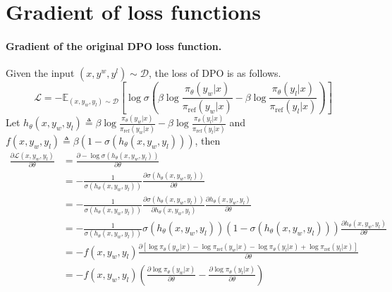 \section{Gradient of loss functions}
\label{sec: app_proof}
\paragraph{Gradient of the original DPO loss function.}
Given the input $(x, y^w, y^l)\sim\mathcal{D}$, the loss of DPO is as follows.
\begin{equation}
    \mathcal{L}=-\mathbb{E}_{(x,y_w,y_l)\sim\mathcal{D}}[\log \sigma (\beta \log\frac{\pi_\theta(y_w|x)}{\pi_{\text{ref}}(y_w|x)} - \beta \log\frac{\pi_\theta(y_l|x)}{\pi_{\text{ref}}(y_l|x)})]
\end{equation}
Let $h_\theta(x,y_w,y_l)\triangleq \beta \log\frac{\pi_\theta(y_w|x)}{\pi_\text{ref}(y_w|x)} - \beta\log\frac{\pi_\theta(y_l|x)}{\pi_\text{ref}(y_l|x)}$ and $f(x,y_w,y_l)\triangleq\beta(1- \sigma(h_\theta(x,y_w,y_l)))$, then
\begin{equation}
\begin{aligned}
    \frac{\partial \mathcal{L}(x,y_w,y_l)}{\partial \theta}
    & = \frac{\partial -\log \sigma(h_\theta(x,y_w,y_l))}{\partial \theta} \\
    & = -\frac{1}{\sigma(h_\theta(x,y_w,y_l))}\frac{\partial \sigma(h_\theta(x,y_w,y_l))}{\partial \theta} \\
    & = -\frac{1}{\sigma(h_\theta(x,y_w,y_l))}\frac{\partial \sigma(h_\theta(x,y_w,y_l))}{\partial h_\theta(x,y_w,y_l)}\frac{\partial h_\theta(x,y_w,y_l)}{\partial \theta} \\
    & = -\frac{1}{\sigma(h_\theta(x,y_w,y_l))}\sigma(h_\theta(x,y_w,y_l))(1-\sigma(h_\theta(x,y_w,y_l)))\frac{\partial h_\theta(x,y_w,y_l)}{\partial \theta} \\
    & = -f(x,y_w,y_l)\frac{\partial [\log\pi_\theta(y_w|x)- \log\pi_\text{ref}(y_w|x) - \log\pi_\theta(y_l|x)+ \log\pi_\text{ref}(y_l|x)]}{\partial \theta}\\
    & = -f(x,y_w,y_l)(\frac{\partial \log\pi_\theta(y_w|x)}{\partial \theta} - \frac{\partial \log\pi_\theta(y_l|x)}{\partial \theta})
\end{aligned}
\end{equation}

